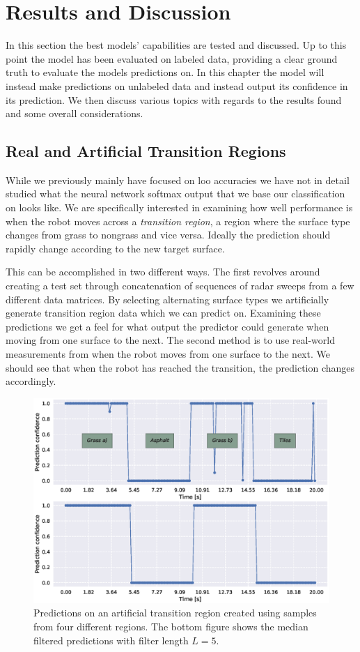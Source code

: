 \chapter{Results and Discussion}
In this section the best models' capabilities are tested and discussed. Up to this point the model has been evaluated on labeled data, providing a clear ground truth to evaluate the models predictions on. In this chapter the model will instead make predictions on unlabeled data and instead output its confidence in its prediction. We then discuss various topics with regards to the results found and some overall considerations.

\section{Real and Artificial Transition Regions}

While we previously mainly have focused on \gls{loo} accuracies we have not in detail studied what the neural network softmax output that we base our classification on looks like. We are specifically interested in examining how well performance is when the robot moves across a \emph{transition region}, a region where the surface type changes from grass to nongrass and vice versa. Ideally the prediction should rapidly change according to the new target surface. 

This can be accomplished in two different ways. The first revolves around creating a test set through concatenation of sequences of radar sweeps from a few different data matrices. By selecting alternating surface types we artificially generate transition region data which we can predict on. Examining these predictions we get a feel for what output the predictor could generate when moving from one surface to the next. The second method is to use real-world measurements from when the robot moves from one surface to the next. We should see that when the robot has reached the transition, the prediction changes accordingly. 

\begin{figure}[t]
	\centering
	\includegraphics[scale=0.5]{figs_temp/varmats1}
	\caption{Predictions on an artificial transition region created using samples from four different regions. The bottom figure shows the median filtered predictions with filter length $L=5$.}
	\label{fig:artificial1}
\end{figure}

